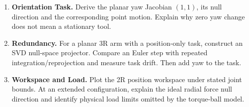 \begin{enumerate}
 \item \textbf{Orientation Task.} Derive the planar yaw Jacobian $(1,1)$, its null direction and the corresponding point motion. Explain why zero yaw change does not mean a stationary tool.
 \item \textbf{Redundancy.} For a planar 3R arm with a position-only task, construct an SVD null-space projector. Compare an Euler step with repeated integration/reprojection and measure task drift. Then add yaw to the task.
 \item \textbf{Workspace and Load.} Plot the 2R position workspace under stated joint bounds. At an extended configuration, explain the ideal radial force null direction and identify physical load limits omitted by the torque-ball model.
\end{enumerate}
